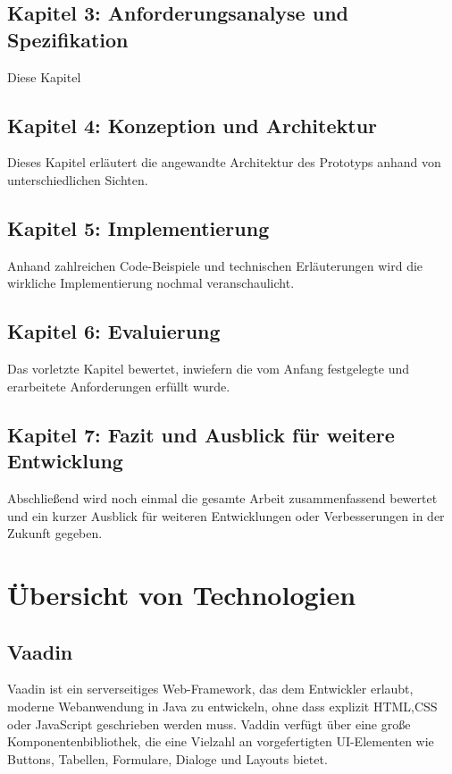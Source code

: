 \documentclass[a4paper,12pt]{scrreprt}
\begin{document}
\section*{\small \textbf{Kapitel 3: Anforderungsanalyse und Spezifikation}}
Diese Kapitel 
\section*{\small \textbf{Kapitel 4: Konzeption und Architektur}}
Dieses Kapitel erläutert die angewandte Architektur des Prototyps anhand von unterschiedlichen Sichten.
\section*{\small \textbf{Kapitel 5: Implementierung}}
Anhand zahlreichen Code-Beispiele und technischen Erläuterungen wird die wirkliche Implementierung nochmal veranschaulicht. 
\section*{\small \textbf{Kapitel 6: Evaluierung}}
Das vorletzte Kapitel bewertet, inwiefern die vom Anfang festgelegte und erarbeitete Anforderungen erfüllt wurde. 
\section*{\small \textbf{Kapitel 7: Fazit und Ausblick für weitere Entwicklung}}
Abschließend wird noch einmal die gesamte Arbeit zusammenfassend bewertet und ein kurzer Ausblick für weiteren Entwicklungen oder Verbesserungen in der Zukunft gegeben.

\chapter{Übersicht von Technologien}
\section{Vaadin}
Vaadin ist ein serverseitiges Web-Framework, das dem Entwickler erlaubt, moderne Webanwendung in Java zu entwickeln, ohne dass explizit HTML,CSS oder JavaScript geschrieben werden muss. Vaddin verfügt über eine große Komponentenbibliothek, die eine Vielzahl an vorgefertigten UI-Elementen wie Buttons, Tabellen, Formulare, Dialoge und Layouts bietet.
\end{document}
